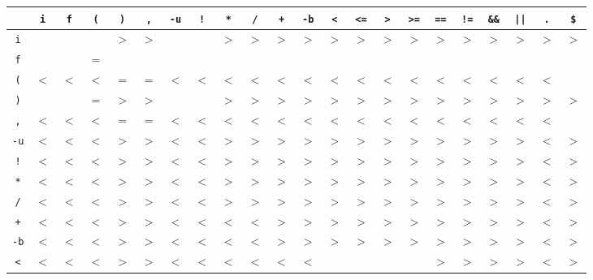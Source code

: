 \begin{table}[H]
\centering
\footnotesize
\setlength{\tabcolsep}{6pt}
\begin{tabular}{|c||c|c|c|c|c|c|c|c|c|c|c|c|c|c|c|c|c|c|c|c|c|}
\hline
 & \texttt{i} & \texttt{f} & \texttt{(} & \texttt{)} & \texttt{,} & \texttt{-u} & \texttt{!} & \texttt{*} & \texttt{/} & \texttt{+} & \texttt{-b} & \texttt{<} & \texttt{<=} & \texttt{>} & \texttt{>=} & \texttt{==} & \texttt{!=} & \texttt{\&\&} & \texttt{||} & \texttt{.} & \texttt{\$} \\
\hline\hline
\texttt{i} &  &  &  & $>$ & $>$ &  &  & $>$ & $>$ & $>$ & $>$ & $>$ & $>$ & $>$ & $>$ & $>$ & $>$ & $>$ & $>$ & $>$ & $>$ \\ \hline
\texttt{f} &  &  & $=$ &  &  &  &  &  &  &  &  &  &  &  &  &  &  &  &  &  &  \\ \hline
\texttt{(} & $<$ & $<$ & $<$ & $=$ & $=$ & $<$ & $<$ & $<$ & $<$ & $<$ & $<$ & $<$ & $<$ & $<$ & $<$ & $<$ & $<$ & $<$ & $<$ & $<$ &  \\ \hline
\texttt{)} &  &  & $=$ & $>$ & $>$ &  &  & $>$ & $>$ & $>$ & $>$ & $>$ & $>$ & $>$ & $>$ & $>$ & $>$ & $>$ & $>$ & $>$ & $>$ \\ \hline
\texttt{,} & $<$ & $<$ & $<$ & $=$ & $=$ & $<$ & $<$ & $<$ & $<$ & $<$ & $<$ & $<$ & $<$ & $<$ & $<$ & $<$ & $<$ & $<$ & $<$ & $<$ &  \\ \hline
\texttt{-u} & $<$ & $<$ & $<$ & $>$ & $>$ & $<$ & $<$ & $>$ & $>$ & $>$ & $>$ & $>$ & $>$ & $>$ & $>$ & $>$ & $>$ & $>$ & $>$ & $<$ & $>$ \\ \hline
\texttt{!} & $<$ & $<$ & $<$ & $>$ & $>$ & $<$ & $<$ & $>$ & $>$ & $>$ & $>$ & $>$ & $>$ & $>$ & $>$ & $>$ & $>$ & $>$ & $>$ & $<$ & $>$ \\ \hline
\texttt{*} & $<$ & $<$ & $<$ & $>$ & $>$ & $<$ & $<$ & $>$ & $>$ & $>$ & $>$ & $>$ & $>$ & $>$ & $>$ & $>$ & $>$ & $>$ & $>$ & $<$ & $>$ \\ \hline
\texttt{/} & $<$ & $<$ & $<$ & $>$ & $>$ & $<$ & $<$ & $>$ & $>$ & $>$ & $>$ & $>$ & $>$ & $>$ & $>$ & $>$ & $>$ & $>$ & $>$ & $<$ & $>$ \\ \hline
\texttt{+} & $<$ & $<$ & $<$ & $>$ & $>$ & $<$ & $<$ & $<$ & $<$ & $>$ & $>$ & $>$ & $>$ & $>$ & $>$ & $>$ & $>$ & $>$ & $>$ & $<$ & $>$ \\ \hline
\texttt{-b} & $<$ & $<$ & $<$ & $>$ & $>$ & $<$ & $<$ & $<$ & $<$ & $>$ & $>$ & $>$ & $>$ & $>$ & $>$ & $>$ & $>$ & $>$ & $>$ & $<$ & $>$ \\ \hline
\texttt{<} & $<$ & $<$ & $<$ & $>$ & $>$ & $<$ & $<$ & $<$ & $<$ & $<$ & $<$ &  &  &  &  & $>$ & $>$ & $>$ & $>$ & $<$ & $>$ \\ \hline

\end{tabular}
\end{table}
